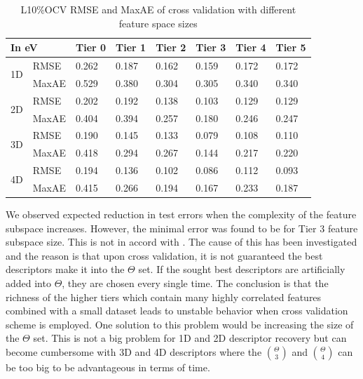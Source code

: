 \documentclass[11pt,oneside,czech,american]{book} %
\theoremstyle{definition} %
\theoremstyle{definition}
\begin{document}
\begin{table}[H]
	\centering
	\begin{tabular}{llllllll} 
		\hline
		\multicolumn{2}{l}{In eV } & Tier 0 & Tier 1 & Tier 2 & Tier 3 & Tier 4 & Tier 5  \\ 
		\hline
		\multirow{2}{*}{1D} & RMSE   & 0.262   & 0.187   & 0.162   & 0.159   & 0.172   & 0.172    \\ 
		
		& MaxAE  & 0.529   & 0.380   & 0.304    & 0.305    & 0.340   & 0.340    \\ 
		\hline
		\multirow{2}{*}{2D} & RMSE   & 0.202    & 0.192   & 0.138   & 0.103    & 0.129   & 0.129    \\ 
		
		& MaxAE  & 0.404   & 0.394   & 0.257   & 0.180   & 0.246   & 0.247    \\ 
		\hline
		\multirow{2}{*}{3D} & RMSE   & 0.190   & 0.145   & 0.133   & 0.079   & 0.108   & 0.110    \\ 
		
		& MaxAE  & 0.418   & 0.294   & 0.267   & 0.144   & 0.217   & 0.220    \\ 
		\hline
		\multirow{2}{*}{4D} & RMSE   & 0.194    & 0.136   & 0.102   & 0.086   & 0.112    & 0.093     \\ 
		
		& MaxAE  & 0.415   & 0.266   & 0.194   & 0.167   & 0.233   & 0.187    \\
		\hline
	\end{tabular}
	\caption{L10\%OCV RMSE and MaxAE of cross validation with different feature space sizes}
	\label{feature_space_cv}
\end{table}
We observed expected reduction in test errors when the complexity of the feature subspace increases. However, the minimal error was found to be for Tier 3 feature subspace size. This is not in accord with \parencite{ghiringhelli17}. The cause of this has been investigated and the reason is that upon cross validation, it is not guaranteed the best descriptors make it into the $\Theta$ set. If the sought best descriptors are artificially added into $\Theta$, they are chosen every single time. The conclusion is that the richness of the higher tiers which contain many highly correlated features combined with a small dataset leads to unstable behavior when cross validation scheme is employed. One solution to this problem would be increasing the size of the $\Theta$ set. This is not a big problem for 1D and 2D descriptor recovery but can become cumbersome with 3D and 4D descriptors where the $\binom{\Theta}{3}$ and $\binom{\Theta}{4}$ can be too big to be advantageous in terms of time.
\end{document}
